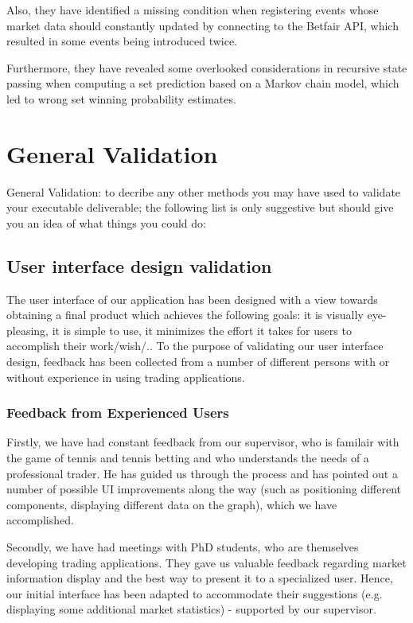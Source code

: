 \documentclass[10pt]{article}
\begin{document}
Also, they have identified a missing condition when registering events whose market data should constantly updated by connecting to the Betfair API, which resulted in some events being introduced twice.

Furthermore, they have revealed some overlooked considerations in recursive state passing when computing a set prediction based on a Markov chain model, which led to wrong set winning probability estimates. 


\section{General Validation}

General Validation: to decribe any other methods you may have used to validate your executable deliverable; the following list is only suggestive but should give you an idea of what things you could do:

\subsection{User interface design validation}

The user interface of our application has been designed with a view towards obtaining a final product which achieves the following goals: it is visually eye-pleasing, it is simple to use, it minimizes the effort it takes for users to accomplish their work/wish/..
To the purpose of validating our user interface design, feedback has been collected from a number of different persons with or without experience in using trading applications.

\subsubsection{Feedback from Experienced Users}

Firstly, we have had constant feedback from our supervisor, who is familair with the game of tennis and tennis betting and who understands the needs of a professional trader. He has guided us through the process and has pointed out a number of possible UI improvements along the way (such as positioning different components, displaying different data on the graph), which we have accomplished.

Secondly, we have had meetings with PhD students, who are themselves developing trading applications. They gave us valuable feedback regarding market information display and the best way to present it to a specialized user. Hence, our initial interface has been adapted to accommodate their suggestions (e.g. displaying some additional market statistics) - supported by our supervisor.
\end{document}
